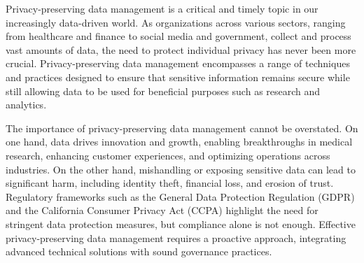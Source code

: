 \documentclass[11pt]{article}
\begin{document}
Privacy-preserving data management is a critical and timely topic in our increasingly data-driven world. As organizations across various sectors, ranging from healthcare and finance to social media and government,
collect and process vast amounts of data, the need to protect individual privacy has never been more crucial. Privacy-preserving data management encompasses a range of techniques and practices designed to ensure that sensitive information remains secure while still allowing data to be used for beneficial purposes such as research and analytics.

The importance of privacy-preserving data management cannot be overstated. On one hand, data drives innovation and growth, enabling breakthroughs in medical research, enhancing customer experiences, and optimizing operations across industries. On the other hand, mishandling or exposing sensitive data can lead to significant harm, including identity theft, financial loss, and erosion of trust. Regulatory frameworks such as the General Data Protection Regulation (GDPR) and the California Consumer Privacy Act (CCPA) highlight the need for stringent data protection measures, but compliance alone is not enough. Effective privacy-preserving data management requires a proactive approach, integrating advanced technical solutions with sound governance practices.
\end{document}
